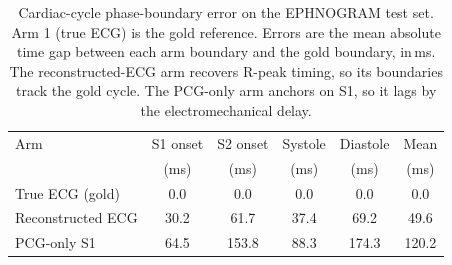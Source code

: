\begin{table}[!t]
\centering
\caption{Cardiac-cycle phase-boundary error on the EPHNOGRAM test set. Arm 1 (true ECG) is the gold reference. Errors are the mean absolute time gap between each arm boundary and the gold boundary, in\,ms. The reconstructed-ECG arm recovers R-peak timing, so its boundaries track the gold cycle. The PCG-only arm anchors on S1, so it lags by the electromechanical delay.}
\label{tab:exp3_boundary}
\begin{tabular}{lccccc}
\toprule
Arm & S1 onset & S2 onset & Systole & Diastole & Mean \\
 & (ms) & (ms) & (ms) & (ms) & (ms) \\
\midrule
True ECG (gold) & 0.0 & 0.0 & 0.0 & 0.0 & 0.0 \\
Reconstructed ECG & 30.2 & 61.7 & 37.4 & 69.2 & 49.6 \\
PCG-only S1 & 64.5 & 153.8 & 88.3 & 174.3 & 120.2 \\
\bottomrule
\end{tabular}
\end{table}
